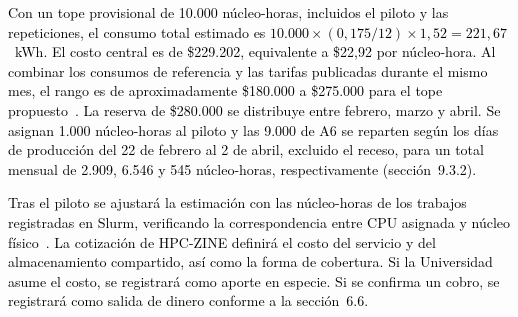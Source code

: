 \textcolor{black}{Con un tope provisional de 10.000 núcleo-horas, incluidos el piloto y las repeticiones, el consumo total estimado es \(10.000 \times (0{,}175/12) \times 1{,}52 = 221{,}67\)~kWh. El costo central es de \$229.202, equivalente a \$22,92 por núcleo-hora. Al combinar los consumos de referencia y las tarifas publicadas durante el mismo mes, el rango es de aproximadamente \$180.000 a \$275.000 para el tope propuesto~\cite{specHpcDl170e,specHpcDl360,enel2026noviembre}. La reserva de \$280.000 se distribuye entre febrero, marzo y abril. Se asignan 1.000 núcleo-horas al piloto y las 9.000 de A6 se reparten según los días de producción \textcolor{black}{del 22 de febrero al 2 de abril, excluido el receso}, para un total mensual de \textcolor{black}{2.909, 6.546 y 545} núcleo-horas, respectivamente (sección~9.3.2).}

\textcolor{black}{Tras el piloto se ajustará la estimación con las núcleo-horas de los trabajos registradas en Slurm, verificando la correspondencia entre CPU asignada y núcleo físico~\cite{schedmdSacctHpc}. La cotización de HPC-ZINE definirá el costo del servicio y del almacenamiento compartido, así como la forma de cobertura. Si la Universidad asume el costo, se registrará como aporte en especie. Si se confirma un cobro, se registrará como salida de dinero conforme a la sección~6.6.}
 
